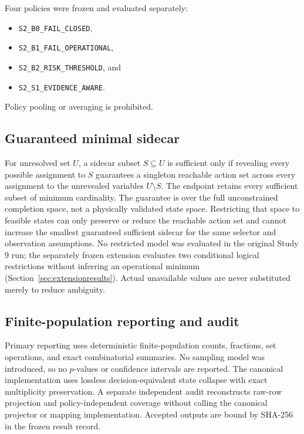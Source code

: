 \documentclass[preprint,12pt]{elsarticle}
\begin{document}
Four policies were frozen and evaluated separately:
\begin{itemize}[nosep,leftmargin=*]
    \item \texttt{S2\_B0\_FAIL\_CLOSED},
    \item \texttt{S2\_B1\_FAIL\_OPERATIONAL},
    \item \texttt{S2\_B2\_RISK\_THRESHOLD}, and
    \item \texttt{S2\_S1\_EVIDENCE\_AWARE}.
\end{itemize}
Policy pooling or averaging is prohibited.

\subsection{Guaranteed minimal sidecar}

For unresolved set $U$, a sidecar subset $S\subseteq U$ is sufficient only if revealing every possible assignment to $S$ guarantees a singleton reachable action set across every assignment to the unrevealed variables $U\setminus S$. The endpoint retains every sufficient subset of minimum cardinality. The guarantee is over the full unconstrained completion space, not a physically validated state space. Restricting that space to feasible states can only preserve or reduce the reachable action set and cannot increase the smallest guaranteed sufficient sidecar for the same selector and observation assumptions. No restricted model was evaluated in the original Study 9 run; the separately frozen extension evaluates two conditional logical restrictions without inferring an operational minimum (Section~\ref{sec:extensionresults}). Actual unavailable values are never substituted merely to reduce ambiguity.

\subsection{Finite-population reporting and audit}

Primary reporting uses deterministic finite-population counts, fractions, set operations, and exact combinatorial summaries. No sampling model was introduced, so no $p$-values or confidence intervals are reported. The canonical implementation uses lossless decision-equivalent state collapse with exact multiplicity preservation. A separate independent audit reconstructs raw-row projection and policy-independent coverage without calling the canonical projector or mapping implementation. Accepted outputs are bound by SHA-256 in the frozen result record.
\end{document}
